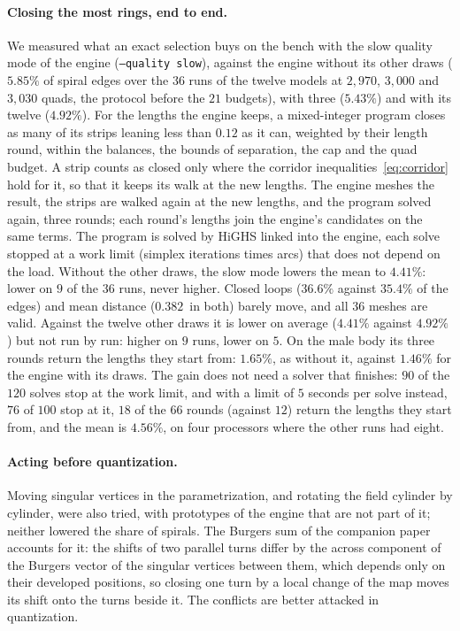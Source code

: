 \documentclass[11pt,a4paper]{article}
\begin{document}
\paragraph{Closing the most rings, end to end.}
We measured what an exact selection buys on the bench with the slow quality
mode of the engine (\texttt{--quality slow}), against the engine without its
other draws ($5.85\%$ of spiral edges over the $36$ runs of the twelve
models at $2{,}970$, $3{,}000$ and $3{,}030$ quads, the protocol before the
$21$ budgets), with three ($5.43\%$) and with its twelve ($4.92\%$). For the lengths the engine keeps,
a mixed-integer program closes as many of its strips leaning less than
$0.12$ as it can, weighted by their length round, within the balances, the
bounds of separation, the cap and the quad budget. A strip counts as closed
only where the corridor inequalities~\eqref{eq:corridor} hold for it, so
that it keeps its walk at the new lengths. The engine meshes the result, the
strips are walked again at the new lengths, and the program solved again,
three rounds; each round's lengths join the engine's candidates on the same
terms. The program is solved by HiGHS linked into the engine, each solve
stopped at a work limit (simplex iterations times arcs) that does not depend
on the load. Without the other draws, the slow mode lowers the mean to
$4.41\%$: lower on $9$ of the $36$ runs, never higher. Closed loops ($36.6\%$
against $35.4\%$ of the edges) and mean distance ($0.382$\textperthousand\
in both) barely move, and all $36$ meshes are valid. Against the twelve
other draws it is lower on average ($4.41\%$ against $4.92\%$) but not run
by run: higher on $9$ runs, lower on $5$. On the male body its three rounds
return the lengths they start from: $1.65\%$, as without it, against
$1.46\%$ for the engine with its draws. The gain does not need a solver that
finishes: $90$ of the $120$ solves stop at the work limit, and with a limit
of $5$ seconds per solve instead, $76$ of $100$ stop at it, $18$ of the $66$
rounds (against $12$) return the lengths they start from, and the mean is
$4.56\%$, on four processors where the other runs had eight.

\paragraph{Acting before quantization.}
Moving singular vertices in the parametrization, and rotating the field
cylinder by cylinder, were also tried, with prototypes of the engine that are
not part of it; neither lowered the share of spirals. The Burgers sum of the
companion paper~\cite{gardent2026turns} accounts for it: the shifts of two
parallel turns differ by the across component of the Burgers vector of the
singular vertices between them, which depends only on their developed
positions, so closing one turn by a local change of the map moves its shift
onto the turns beside it. The conflicts are better attacked in quantization.
\end{document}
